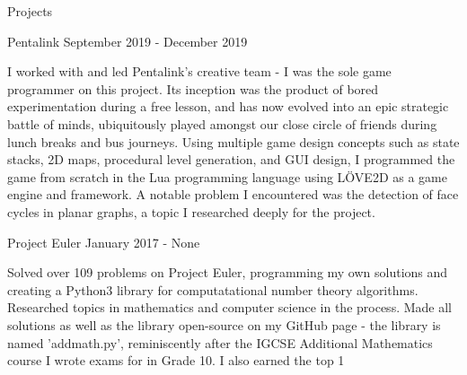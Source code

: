 \documentclass{resume} %
\begin{document}
\begin{rSection}{Projects}


\begin{rSubsection}{ Pentalink }{ September 2019 - December 2019 }{}
\item I worked with and led Pentalink's creative team - I was the sole game programmer on this project. Its inception was the product of bored experimentation during a free lesson, and has now evolved into an epic strategic battle of minds, ubiquitously played amongst our close circle of friends during lunch breaks and bus journeys. Using multiple game design concepts such as state stacks, 2D maps, procedural level generation, and GUI design, I programmed the game from scratch in the Lua programming language using LÖVE2D as a game engine and framework. A notable problem I encountered was the detection of face cycles in planar graphs, a topic I researched deeply for the project.
\end{rSubsection}



\begin{rSubsection}{ Project Euler }{ January 2017 - None }{}
\item Solved over 109 problems on Project Euler, programming my own solutions and creating a Python3 library for computatational number theory algorithms. Researched topics in mathematics and computer science in the process. Made all solutions as well as the library open-source on my GitHub page - the library is named 'addmath.py', reminiscently after the IGCSE Additional Mathematics course I wrote exams for in Grade 10. I also earned the top 1%
\end{rSubsection}






\end{rSection}
\end{document}
